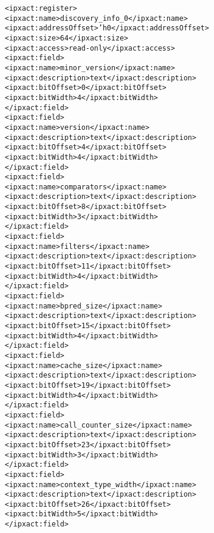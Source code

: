 \begin{alltt}
            <ipxact:register>
               <ipxact:name>discovery_info_0</ipxact:name>
               <ipxact:addressOffset>'h0</ipxact:addressOffset>
               <ipxact:size>64</ipxact:size>
               <ipxact:access>read-only</ipxact:access>
               <ipxact:field>
                  <ipxact:name>minor_version</ipxact:name>
                  <ipxact:description>text</ipxact:description>
                  <ipxact:bitOffset>0</ipxact:bitOffset>
                  <ipxact:bitWidth>4</ipxact:bitWidth>
               </ipxact:field>
               <ipxact:field>
                  <ipxact:name>version</ipxact:name>
                  <ipxact:description>text</ipxact:description>
                  <ipxact:bitOffset>4</ipxact:bitOffset>
                  <ipxact:bitWidth>4</ipxact:bitWidth>
               </ipxact:field>
               <ipxact:field>
                  <ipxact:name>comparators</ipxact:name>
                  <ipxact:description>text</ipxact:description>
                  <ipxact:bitOffset>8</ipxact:bitOffset>
                  <ipxact:bitWidth>3</ipxact:bitWidth>
               </ipxact:field>
               <ipxact:field>
                  <ipxact:name>filters</ipxact:name>
                  <ipxact:description>text</ipxact:description>
                  <ipxact:bitOffset>11</ipxact:bitOffset>
                  <ipxact:bitWidth>4</ipxact:bitWidth>
               </ipxact:field>
               <ipxact:field>
                  <ipxact:name>bpred_size</ipxact:name>
                  <ipxact:description>text</ipxact:description>
                  <ipxact:bitOffset>15</ipxact:bitOffset>
                  <ipxact:bitWidth>4</ipxact:bitWidth>
               </ipxact:field>
               <ipxact:field>
                  <ipxact:name>cache_size</ipxact:name>
                  <ipxact:description>text</ipxact:description>
                  <ipxact:bitOffset>19</ipxact:bitOffset>
                  <ipxact:bitWidth>4</ipxact:bitWidth>
               </ipxact:field>
               <ipxact:field>
                  <ipxact:name>call_counter_size</ipxact:name>
                  <ipxact:description>text</ipxact:description>
                  <ipxact:bitOffset>23</ipxact:bitOffset>
                  <ipxact:bitWidth>3</ipxact:bitWidth>
               </ipxact:field>
               <ipxact:field>
                  <ipxact:name>context_type_width</ipxact:name>
                  <ipxact:description>text</ipxact:description>
                  <ipxact:bitOffset>26</ipxact:bitOffset>
                  <ipxact:bitWidth>5</ipxact:bitWidth>
               </ipxact:field>

\end{alltt}

